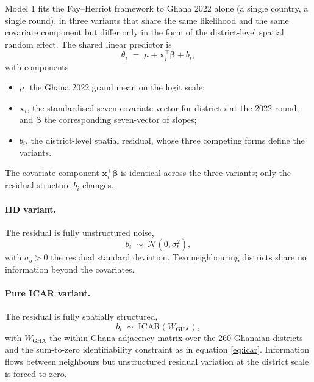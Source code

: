 \documentclass{article}
\begin{document}
\label{sec:m1}

Model 1 fits the Fay--Herriot framework to Ghana 2022 alone (a single
country, a single round), in three variants that share the same
likelihood and the same covariate component but differ only in the form
of the district-level spatial random effect. The shared linear predictor
is \begin{equation}
\theta_i \;=\; \mu + \mathbf{x}_i^{\top} \bm{\beta} + b_i,
\label{eq:m1}
\end{equation} with components

\begin{itemize}
\item $\mu$, the Ghana 2022 grand mean on the logit scale;
\item $\mathbf{x}_i$, the standardised seven-covariate vector for district $i$ at the 2022 round, and $\bm{\beta}$ the corresponding seven-vector of slopes;
\item $b_i$, the district-level spatial residual, whose three competing forms define the variants.
\end{itemize}

The covariate component \(\mathbf{x}_i^{\top} \bm{\beta}\) is identical
across the three variants; only the residual structure \(b_i\) changes.

\paragraph{IID variant.}

The residual is fully unstructured noise, \begin{equation}
b_i \;\sim\; \mathcal{N}(0, \sigma_b^{2}),
\label{eq:m1-iid}
\end{equation} with \(\sigma_b > 0\) the residual standard deviation.
Two neighbouring districts share no information beyond the covariates.

\paragraph{Pure ICAR variant.}

The residual is fully spatially structured, \begin{equation}
b_i \;\sim\; \mathrm{ICAR}(W_{\text{GHA}}),
\label{eq:m1-icar}
\end{equation} with \(W_{\text{GHA}}\) the within-Ghana adjacency matrix
over the 260 Ghanaian districts and the sum-to-zero identifiability
constraint as in equation \ref{eq:icar}. Information flows between
neighbours but unstructured residual variation at the district scale is
forced to zero.
\end{document}
